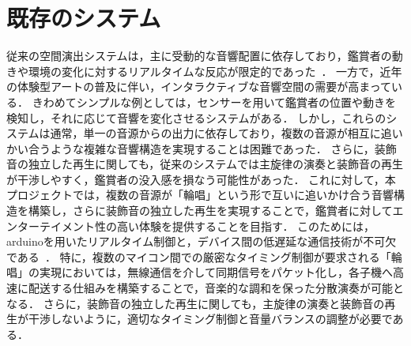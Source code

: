 \documentclass[uplatex,dvipdfmx]{jlreq}
\begin{document}
\section{既存のシステム}
従来の空間演出システムは，主に受動的な音響配置に依存しており，鑑賞者の動きや環境の変化に対するリアルタイムな反応が限定的であった~\cite{110}．
一方で，近年の体験型アートの普及に伴い，インタラクティブな音響空間の需要が高まっている．
きわめてシンプルな例としては，センサーを用いて鑑賞者の位置や動きを検知し，それに応じて音響を変化させるシステムがある．
しかし，これらのシステムは通常，単一の音源からの出力に依存しており，複数の音源が相互に追いかい合うような複雑な音響構造を実現することは困難であった．
さらに，装飾音の独立した再生に関しても，従来のシステムでは主旋律の演奏と装飾音の再生が干渉しやすく，鑑賞者の没入感を損なう可能性があった．
これに対して，本プロジェクトでは，複数の音源が「輪唱」という形で互いに追いかけ合う音響構造を構築し，さらに装飾音の独立した再生を実現することで，鑑賞者に対してエンターテイメント性の高い体験を提供することを目指す．
このためには，arduinoを用いたリアルタイム制御と，デバイス間の低遅延な通信技術が不可欠である~\cite{mitubishi}．
特に，複数のマイコン間での厳密なタイミング制御が要求される「輪唱」の実現においては，無線通信を介して同期信号をパケット化し，各子機へ高速に配送する仕組みを構築することで，音楽的な調和を保った分散演奏が可能となる．
さらに，装飾音の独立した再生に関しても，主旋律の演奏と装飾音の再生が干渉しないように，適切なタイミング制御と音量バランスの調整が必要である．
\end{document}
